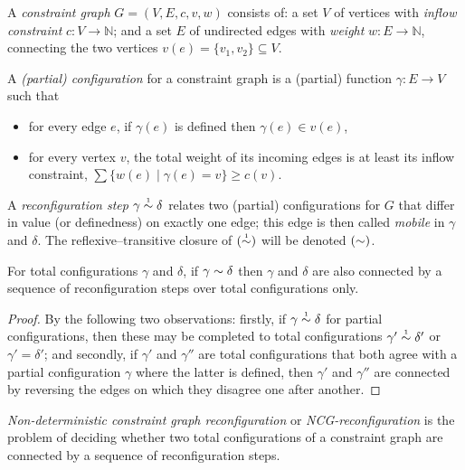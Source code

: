 \documentclass{sigplanconf}
\let\capsabbrev=\uppercase
\begin{document}
\begin{definition} 
A \emph{constraint graph} $G=(V,E,c,v,w)$ consists of: a set $V$ of vertices with \emph{inflow constraint} $c\colon V\to\mathbb N$; and a set $E$ of undirected edges with \emph{weight} $w\colon E\to\mathbb N$, connecting the two vertices $v(e)=\{v_1,v_2\}\subseteq V$.

\smallskip

A \emph{(partial) configuration} for a constraint graph is a (partial) function $\gamma\colon E\to V$ such that
\begin{itemize}
	\item
for every edge $e$, if $\gamma(e)$ is defined then $\gamma(e)\in v(e)$,
	\item
for every vertex $v$, the total weight of its incoming edges is at least its inflow constraint, 
$\sum\{w(e)\mid\gamma(e)=v\}\geq c(v)$.
\end{itemize} 

\smallskip
A \emph{reconfiguration step} $\gamma\perm*\delta$ relates two (partial) configurations for $G$ that differ in value (or definedness) on exactly one edge; this edge is then called \emph{mobile} in $\gamma$ and $\delta$.
%
The reflexive--transitive closure of $(\perm*)$ will be denoted $(\perm)$.
%
\end{definition}


\begin{proposition}
\label{prop:partial simulates total reconfiguration}
For total configurations $\gamma$ and $\delta$, if $\gamma\perm\delta$ then $\gamma$ and $\delta$ are also connected by a sequence of reconfiguration steps over total configurations only.
\end{proposition}


\begin{proof}
By the following two observations: firstly, 
%
if $\gamma\perm*\delta$ for partial configurations, then these may be completed to total configurations $\gamma'\perm*\delta'$ or $\gamma'=\delta'$; and secondly,
%
if $\gamma'$ and $\gamma''$ are total configurations that both agree with a partial configuration $\gamma$ where the latter is defined, then $\gamma'$ and $\gamma''$ are connected by reversing the edges on which they disagree one after another.
%
\end{proof}


\emph{Non-deterministic constraint graph reconfiguration} or \emph{\capsabbrev{ncg}-reconfiguration} is the problem of deciding whether two total configurations of a constraint graph are connected by a sequence of reconfiguration steps.
%
\end{document}
